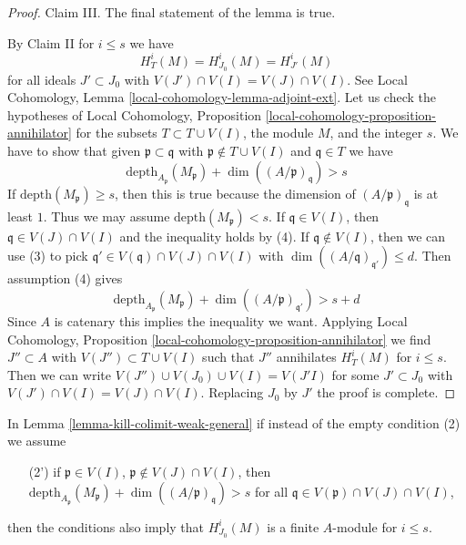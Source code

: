 \begin{proof}
\medskip\noindent
Claim III. The final statement of the lemma is true.

\medskip\noindent
By Claim II for $i \leq s$ we have
$$
H^i_T(M) = H^i_{J_0}(M) = H^i_{J'}(M)
$$
for all ideals $J' \subset J_0$ with $V(J')  \cap V(I) = V(J) \cap V(I)$.
See Local Cohomology, Lemma \ref{local-cohomology-lemma-adjoint-ext}.
Let us check the hypotheses of Local Cohomology,
Proposition \ref{local-cohomology-proposition-annihilator}
for the subsets $T \subset T \cup V(I)$, the module $M$, and the integer $s$.
We have to show that given $\mathfrak p \subset \mathfrak q$
with $\mathfrak p \not \in T \cup V(I)$ and $\mathfrak q \in T$
we have
$$
\text{depth}_{A_\mathfrak p}(M_\mathfrak p) +
\dim((A/\mathfrak p)_\mathfrak q) > s
$$
If $\text{depth}(M_\mathfrak p) \geq s$, then this is true because
the dimension of $(A/\mathfrak p)_\mathfrak q$ is at least $1$.
Thus we may assume $\text{depth}(M_\mathfrak p) < s$.
If $\mathfrak q \in V(I)$, then $\mathfrak q \in V(J) \cap V(I)$
and the inequality holds by (4). If $\mathfrak q \not \in V(I)$,
then we can use (3) to pick
$\mathfrak q' \in V(\mathfrak q) \cap V(J) \cap V(I)$ with
$\dim((A/\mathfrak q)_{\mathfrak q'}) \leq d$.
Then assumption (4) gives
$$
\text{depth}_{A_\mathfrak p}(M_\mathfrak p) +
\dim((A/\mathfrak p)_{\mathfrak q'}) > s + d
$$
Since $A$ is catenary this implies the inequality we want.
Applying Local Cohomology,
Proposition \ref{local-cohomology-proposition-annihilator} we
find $J'' \subset A$ with $V(J'') \subset T \cup V(I)$
such that $J''$ annihilates $H^i_T(M)$ for $i \leq s$.
Then we can write $V(J'') \cup V(J_0) \cup V(I) = V(J'I)$
for some $J' \subset J_0$ with $V(J') \cap V(I) = V(J) \cap V(I)$.
Replacing $J_0$ by $J'$ the proof is complete.
\end{proof}

\begin{lemma}
\label{lemma-kill-colimit-general}
In Lemma \ref{lemma-kill-colimit-weak-general} if instead of the empty
condition (2) we assume
\begin{enumerate}
\item[(2')] if $\mathfrak p \in V(I)$, $\mathfrak p \not \in V(J) \cap V(I)$,
then
$\text{depth}_{A_\mathfrak p}(M_\mathfrak p) +
\dim((A/\mathfrak p)_\mathfrak q) > s$
for all $\mathfrak q \in V(\mathfrak p) \cap V(J) \cap V(I)$,
\end{enumerate}
then the conditions also imply that $H^i_{J_0}(M)$ is a finite
$A$-module for $i \leq s$.
\end{lemma}

